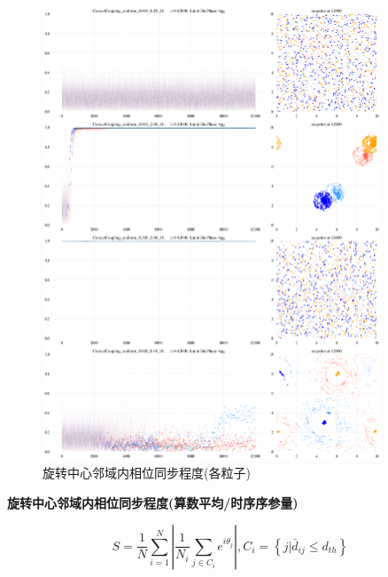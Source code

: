 \documentclass{article}
\begin{document}
\begin{figure}[H]
	\centering
	\includegraphics[width=0.9\textwidth]{./figs/limitDisPhaseSync_ts.png}
	\caption{旋转中心邻域内相位同步程度(各粒子)}
	\label{fig:fig234t.2}
\end{figure}

\newpage
\noindent\textbf{旋转中心邻域内相位同步程度(算数平均/时序序参量)}

$$
S=\frac{1}{N}\sum_{i=1}^N{\left| \frac{1}{N_i}\sum_{j\in C_i}{e^{i\theta _j}} \right|}, C_i=\left\{ j|\bar{d}_{ij}\le d_{th} \right\} 
$$
\end{document}
